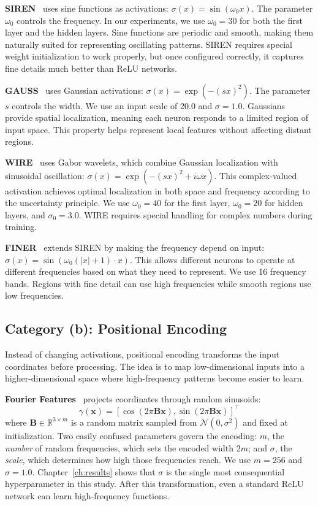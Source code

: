 \textbf{SIREN}~\cite{sitzmann2020siren} uses sine functions as activations: $\sigma(x) = \sin(\omega_0 x)$. The parameter $\omega_0$ controls the frequency. In our experiments, we use $\omega_0 = 30$ for both the first layer and the hidden layers. Sine functions are periodic and smooth, making them naturally suited for representing oscillating patterns. SIREN requires special weight initialization to work properly, but once configured correctly, it captures fine details much better than ReLU networks.

\textbf{GAUSS}~\cite{ramasinghe2022gauss} uses Gaussian activations: $\sigma(x) = \exp(-(sx)^2)$. The parameter $s$ controls the width. We use an input scale of 20.0 and $\sigma = 1.0$. Gaussians provide spatial localization, meaning each neuron responds to a limited region of input space. This property helps represent local features without affecting distant regions.

\textbf{WIRE}~\cite{saragadam2023wire} uses Gabor wavelets, which combine Gaussian localization with sinusoidal oscillation: $\sigma(x) = \exp(-(sx)^2 + i\omega x)$. This complex-valued activation achieves optimal localization in both space and frequency according to the uncertainty principle. We use $\omega_0 = 40$ for the first layer, $\omega_0 = 20$ for hidden layers, and $\sigma_0 = 3.0$. WIRE requires special handling for complex numbers during training.

\textbf{FINER}~\cite{liu2024finer} extends SIREN by making the frequency depend on input: $\sigma(x) = \sin(\omega_0(|x| + 1) \cdot x)$. This allows different neurons to operate at different frequencies based on what they need to represent. We use 16 frequency bands. Regions with fine detail can use high frequencies while smooth regions use low frequencies.

\subsection{Category (b): Positional Encoding}

Instead of changing activations, positional encoding transforms the input coordinates before processing. The idea is to map low-dimensional inputs into a higher-dimensional space where high-frequency patterns become easier to learn.

\textbf{Fourier Features}~\cite{tancik2020fourier} projects coordinates through random sinusoids:
\begin{equation}
    \gamma(\mathbf{x}) = [\cos(2\pi\mathbf{B}\mathbf{x}), \sin(2\pi\mathbf{B}\mathbf{x})]^\top
\end{equation}
where $\mathbf{B} \in \mathbb{R}^{3 \times m}$ is a random matrix sampled from $\mathcal{N}(0, \sigma^2)$ and fixed at initialization. Two easily confused parameters govern the encoding: $m$, the \emph{number} of random frequencies, which sets the encoded width $2m$; and $\sigma$, the \emph{scale}, which determines how high those frequencies reach. We use $m = 256$ and $\sigma = 1.0$. Chapter~\ref{ch:results} shows that $\sigma$ is the single most consequential hyperparameter in this study. After this transformation, even a standard ReLU network can learn high-frequency functions.

